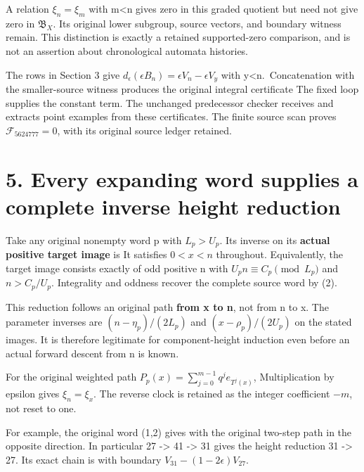 A relation \(\xi_n=\xi_m\) with m\textless n gives zero in this graded
quotient but need not give zero in \(\mathfrak B_X\). Its original lower
subgroup, source vectors, and boundary witness remain. This distinction
is exactly a retained supported-zero comparison, and is not an assertion
about chronological automata histories.

The rows in Section 3 give
\(d_\epsilon(\epsilon B_n)=\epsilon V_n-\epsilon V_y\) with
y\textless n.~Concatenation with the smaller-source witness produces the
original integral certificate
 The fixed
loop supplies the constant term. The unchanged predecessor checker
receives and extracts point examples from these certificates. The finite
source scan proves \(\mathcal F_{5624777}=0\), with its original source
ledger retained.

\section{5. Every expanding word supplies a complete inverse height
reduction}

Take any original nonempty word p with \(L_p>U_p\). Its inverse on its
\textbf{actual positive target image} is
 It satisfies
\(0<x<n\) throughout. Equivalently, the target image consists exactly of
odd positive n with \(U_pn\equiv C_p\pmod{L_p}\) and \(n>C_p/U_p\).
Integrality and oddness recover the complete source word by (2).

This reduction follows an original path \textbf{from x to n}, not from n
to x. The parameter inverses are \((n-\eta_p)/(2L_p)\) and
\((x-\rho_p)/(2U_p)\) on the stated images. It is therefore legitimate
for component-height induction even before an actual forward descent
from n is known.

For the original weighted path
\(P_p(x)=\sum_{j=0}^{m-1}q^j e_{T^j(x)}\),
 Multiplication by epsilon
gives \(\xi_n=\xi_x\). The reverse clock is retained as the integer
coefficient \(-m\), not reset to one.

For example, the original word (1,2) gives
 with the original two-step
path in the opposite direction. In particular 27 -\textgreater{} 41
-\textgreater{} 31 gives the height reduction 31 -\textgreater{} 27. Its
exact chain is 
with boundary \(V_{31}-(1-2\epsilon)V_{27}\).


